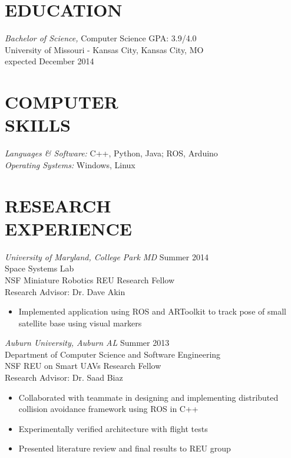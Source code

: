 \documentclass[line,margin]{res}
\begin{document}
\address{\hfill (913) 235-1070 \textbar \textbar \hspace{1 mm}  victoria.chen.wu@gmail.com \textbar \textbar \hspace{1 mm} vptarmigan.wordpress.com} 

 
\begin{resume}
 
\section{EDUCATION} {\sl Bachelor of Science,} Computer Science	\hfill GPA: 3.9/4.0\\
                University of Missouri - Kansas City, Kansas City, MO \\
                expected December 2014 
\section{COMPUTER \\ SKILLS} {\sl Languages \& Software:} 
		C++, Python, Java; ROS, Arduino \\
                {\sl Operating Systems:} Windows, Linux 
\section {RESEARCH \\ EXPERIENCE}
		{\sl University of Maryland, College Park MD}  \hfill  Summer 2014\\
		Space Systems Lab\\
		NSF Miniature Robotics REU Research Fellow \\
		Research Advisor: Dr. Dave Akin 
                 \begin{itemize}[leftmargin=5mm]  \itemsep -2pt %
		 \item Implemented application using ROS and ARToolkit to track pose of small satellite base using visual markers
         \end{itemize} 
		
		{\sl Auburn University, Auburn AL}  \hfill  Summer 2013\\
		Department of Computer Science and Software Engineering  \\
		NSF REU on Smart UAVs Research Fellow \\
		Research Advisor: Dr. Saad Biaz
                 \begin{itemize}[leftmargin=5mm]  \itemsep -2pt %
		 \item Collaborated with teammate in designing and implementing distributed collision avoidance framework using ROS in C++ 
		 \item Experimentally verified architecture with flight tests 
		 \item Presented literature review and final results to REU group
         \end{itemize} 


\end{resume}
\end{document}
